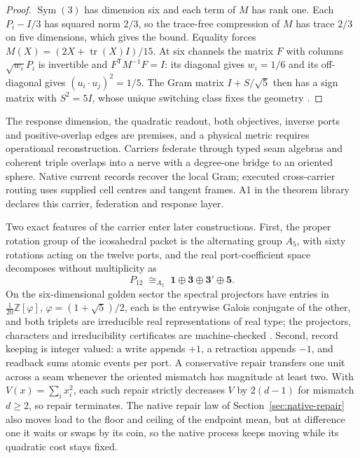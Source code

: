 \documentclass[11pt]{article}
\theoremstyle{definition}
\theoremstyle{remark}
\begin{document}
\begin{proof}
$\operatorname{Sym}(3)$ has dimension six and each term of $M$ has rank one. Each
$P_i-I/3$ has squared norm $2/3$, so the trace-free compression of $M$ has trace $2/3$ on
five dimensions, which gives the bound. Equality forces $M(X)=(2X+\operatorname{tr}(X)I)/15$.
At six channels the matrix $F$ with columns $\sqrt{w_i}P_i$ is invertible and
$F^{\mathsf T}M^{-1}F=I$: its diagonal gives $w_i=1/6$ and its off-diagonal gives
$(u_i\cdot u_j)^2=1/5$. The Gram matrix $I+S/\sqrt5$ then has a sign matrix with $S^2=5I$,
whose unique switching class fixes the geometry \cite{ophMicrophysics}.
\end{proof}

The response dimension, the quadratic readout, both objectives, inverse ports and
positive-overlap edges are premises, and a physical metric requires operational
reconstruction. Carriers federate through typed seam
algebras and coherent triple overlaps into a nerve with a degree-one bridge
to an oriented sphere.
Native current records recover the local Gram; executed cross-carrier
routing uses supplied cell centres and tangent frames. A1 in the theorem
library declares this carrier, federation and response layer.

Two exact features of the carrier enter later constructions. First, the
proper rotation group of the icosahedral packet is the alternating group
$A_{5}$, with sixty rotations acting on the twelve ports, and the real
port-coefficient space decomposes without multiplicity as
\begin{equation}
P_{12}\;\cong_{A_5}\;\mathbf 1\oplus\mathbf 3\oplus\mathbf 3'\oplus\mathbf 5 .
\label{eq:bands}
\end{equation}
On the six-dimensional golden sector the spectral projectors have entries in
$\tfrac1{20}\mathbb Z[\varphi]$, $\varphi=(1+\sqrt5)/2$, each is the
entrywise Galois conjugate of the other, and both triplets are irreducible
real representations of real type; the projectors, characters and
irreducibility certificates are machine-checked
\cite{serre1977,ophrepo}. Second, record keeping is integer valued: a write
appends $+1$, a retraction appends $-1$, and readback sums atomic events per
port. A conservative repair transfers one unit across a seam whenever the
oriented mismatch has magnitude at least two. With $V(x)=\sum_ix_i^{2}$, each such repair strictly decreases $V$ by $2(d-1)$ for mismatch $d\ge 2$,
so repair terminates. The native repair law of
Section~\ref{sec:native-repair} also moves load to the floor and ceiling of
the endpoint mean, but at difference one it waits or swaps by its coin, so
the native process keeps moving while its quadratic cost stays fixed.
\end{document}
